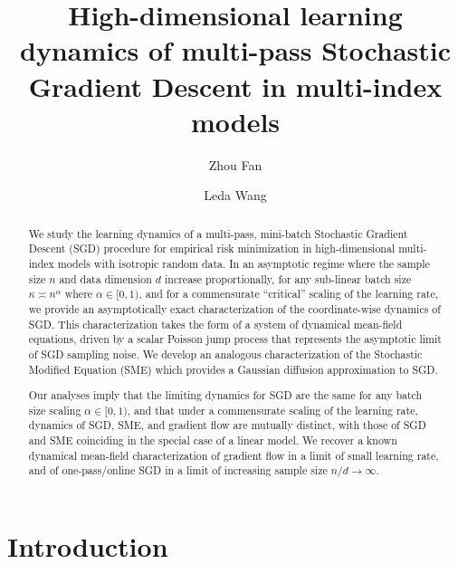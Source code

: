 \documentclass[11pt,letterpaper,reqno]{amsart}
\title[High-dimensional learning dynamics of multi-pass SGD]
{High-dimensional learning dynamics of multi-pass Stochastic Gradient
Descent in multi-index models}
\author{Zhou Fan}
\author{Leda Wang}
\theoremstyle{definition}
\begin{document}
\begin{abstract}
We study the learning dynamics of a multi-pass, mini-batch Stochastic
Gradient Descent (SGD) procedure for empirical risk minimization in
high-dimensional multi-index models with isotropic random data. In an
asymptotic regime where the sample size $n$ and data dimension $d$ increase
proportionally, for any sub-linear batch size $\kappa \asymp n^\alpha$ where
$\alpha \in [0,1)$, and for a commensurate ``critical'' scaling of the
learning rate, we provide an asymptotically exact characterization of
the coordinate-wise dynamics of SGD. This characterization takes
the form of a system of dynamical mean-field equations, driven by a scalar
Poisson jump process that represents the asymptotic limit of SGD sampling
noise. We develop an analogous characterization of the Stochastic Modified
Equation (SME) which provides a Gaussian diffusion approximation to SGD.

Our analyses imply that the limiting dynamics for SGD are the same for
any batch size scaling $\alpha \in [0,1)$, and that under a commensurate scaling of the learning rate,
dynamics of SGD, SME, and gradient flow
are mutually distinct, with those of SGD and SME coinciding in the special 
case of a linear model. We recover a known dynamical mean-field characterization
of gradient flow in a limit of small learning rate, and of
one-pass/online SGD in a limit of increasing sample size $n/d \to \infty$.
\end{abstract}


\maketitle


\section{Introduction}
\end{document}
